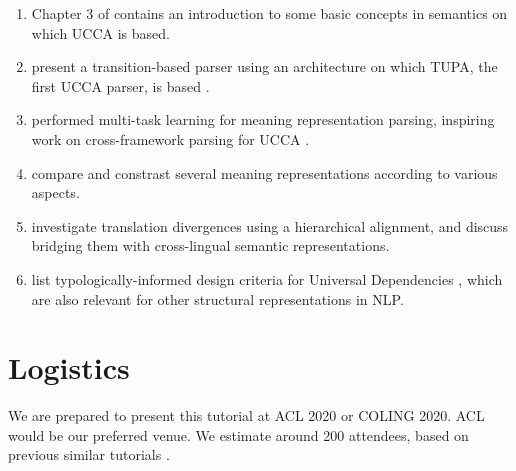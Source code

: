 \documentclass[11pt,a4paper,table]{article}
\begin{document}
\begin{enumerate}
    \item Chapter 3 of  contains an introduction
    to some basic concepts in semantics on which UCCA is based.
    \item {} present a
    transition-based parser using an architecture on which TUPA, the first
    UCCA parser, is based \cite{hershcovich2017a}.
    \item {} performed multi-task learning for
    meaning representation parsing, inspiring work on cross-framework
    parsing for UCCA \cite{hershcovich2018multitask}.
    \item {} compare and constrast several meaning
    representations according to various aspects.
    \item {} investigate translation divergences
    using a hierarchical alignment,
    and discuss bridging them with cross-lingual semantic representations.
    \item {} list typologically-informed design 
    criteria for Universal Dependencies \cite{11234/1-2988},
    which are also relevant for other structural representations in NLP.
\end{enumerate}

\section{Logistics}\label{sec:logistics}

We are prepared to present this tutorial at
ACL 2020 or COLING 2020. ACL would be our preferred venue.
We estimate around 200 attendees, based on previous similar tutorials
\cite{amrtutorial,koller2019graph}.
\end{document}
